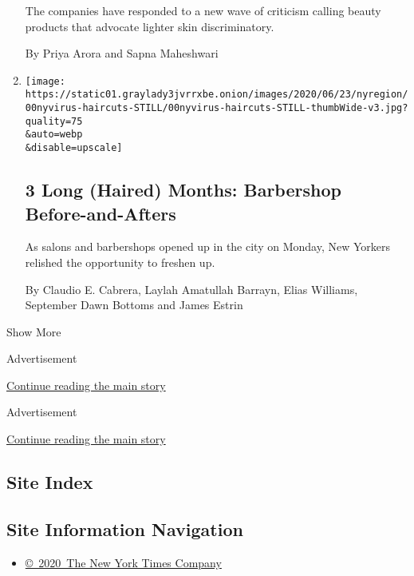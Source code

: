 \begin{enumerate}
  The companies have responded to a new wave of criticism calling beauty
  products that advocate lighter skin discriminatory.

  By Priya Arora and Sapna Maheshwari
\item
  \href{/2020/06/25/nyregion/nyc-barber-shops-coronavirus.html}{}

  \texttt{[image: https://static01.graylady3jvrrxbe.onion/images/2020/06/23/nyregion/00nyvirus-haircuts-STILL/00nyvirus-haircuts-STILL-thumbWide-v3.jpg?quality=75\\\&auto=webp\\\&disable=upscale]}

  \hypertarget{3-long-haired-months-barbershop-before-and-afters}{%
  \subsection{3 Long (Haired) Months: Barbershop
  Before-and-Afters}\label{3-long-haired-months-barbershop-before-and-afters}}

  As salons and barbershops opened up in the city on Monday, New Yorkers
  relished the opportunity to freshen up.

  By Claudio E. Cabrera, Laylah Amatullah Barrayn, Elias Williams,
  September Dawn Bottoms and James Estrin
\end{enumerate}

Show More

Advertisement

\protect\hyperlink{after-mid8}{Continue reading the main story}

Advertisement

\protect\hyperlink{after-mktg}{Continue reading the main story}

\hypertarget{site-index}{%
\subsection{Site Index}\label{site-index}}

\hypertarget{site-information-navigation}{%
\subsection{Site Information
Navigation}\label{site-information-navigation}}

\begin{itemize}
\tightlist
\item
  \href{https://help.nytimes3xbfgragh.onion/hc/en-us/articles/115014792127-Copyright-notice}{©~2020~The
  New York Times Company}
\end{itemize}

